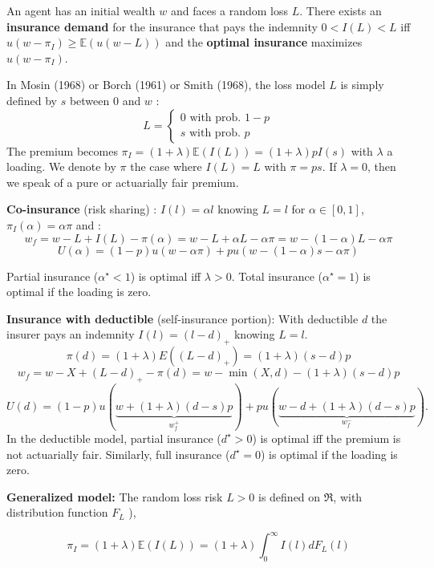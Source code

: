 \begin{f}
	
An agent has an initial wealth \(w\) and faces a random loss \(L\). There exists an \textbf{insurance demand} for the insurance that pays the indemnity \(0<I(L)<L\) iff \(u(w-\pi_I) \geq \mathbb{E}(u(w-L))\) and the \textbf{optimal insurance} maximizes \(u(w-\pi_I)\).

In Mosin (1968) or Borch (1961) or Smith (1968), the loss model \(L\) is simply defined by \(s\) between 0 and \(w\) :
	\[
	L=\left\{\begin{array}{l}
		0 \text { with prob. } 1-p \\
		s \text { with prob. } p
	\end{array}\right.
	\]
The premium becomes \(\pi_I=(1+\lambda) \mathbb{E}(I(L))=(1+\lambda) p I(s)\) with \(\lambda\) a loading. We denote by \(\pi\) the case where \(I(L)=L\) with \(\pi= p s\). If \(\lambda=0\), then we speak of a pure or actuarially fair premium.
\medskip

\textbf{Co-insurance} (risk sharing) :
\(I(l)=\alpha l\) knowing \(L=l\) for \(\alpha \in[0,1]\), \(\pi_I(\alpha)=\alpha \pi\) and :
\[
w_{f}=w-L+I(L)-\pi(\alpha)=w-L+\alpha L-\alpha \pi=w-(1-\alpha) L-\alpha \pi
\]
\[
U(\alpha)%
=(1-p) u(w-\alpha \pi)+p u(w-(1-\alpha) s-\alpha \pi)
\]

Partial insurance (\(\alpha^{\star}<1\)) is optimal iff \(\lambda>0\). Total insurance (\(\alpha^{\star}=1\)) is optimal if the loading is zero.
\medskip

\textbf{Insurance with deductible} (self-insurance portion):
With deductible \(d\) the insurer pays an indemnity \(I(l)=(l-d)_{+}\) knowing \(L=l\).
\[
\pi(d)=(1+\lambda) E\left((L-d)_{+}\right)=(1+\lambda)(s-d) p
\]
\[
w_{f}=w-X+(L-d)_{+}-\pi(d)=w-\min (X, d)-(1+\lambda)(s-d) p
\]
\[
U(d)=(1-p) u(\underbrace{w+(1+\lambda)(d-s) p}_{w_{f}^{+}})+p u(\underbrace{w-d+(1+\lambda)(d-s) p}_{w_{f}^{-}}) .
\]
In the deductible model, partial insurance (\(d^{\star}>0\)) is optimal iff the premium is not actuarially fair. Similarly, full insurance (\(d^{\star}=0\)) is optimal if the loading is zero.
\medskip

\textbf{Generalized model:}
The random loss risk \(L>0\) is defined on \(\Re\), with distribution function \(F_L\) ),

\[
\pi_I=(1+\lambda) \mathbb{E}(I(L))=(1+\lambda) \int_{0}^{\infty} I(l) d F_{L}(l)
\]




\end{f}

